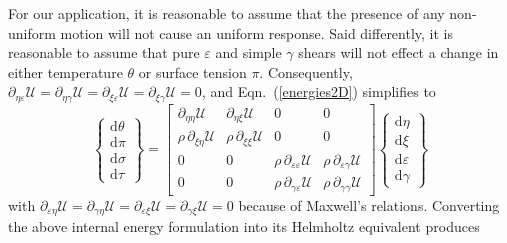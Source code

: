 For our application, it is reasonable to assume that the presence of any non-uniform motion will not cause an uniform response.  Said differently, it is reasonable to assume that pure $\varepsilon$ and simple $\gamma$ shears will not effect a change in either temperature $\theta$ or surface tension $\pi$.  Consequently, $\partial_{\eta\varepsilon} \mathcal{U} = \partial_{\eta\gamma} \mathcal{U} = \partial_{\xi\varepsilon} \mathcal{U} = \partial_{\xi\gamma} \mathcal{U} = 0$, and Eqn.~(\ref{energies2D}) simplifies to
\begin{displaymath}
\left\{ \begin{matrix}
\mathrm{d} \theta \\ \mathrm{d} \pi \\
\mathrm{d} \sigma \\ \mathrm{d} \tau
\end{matrix} \right\} = \begin{bmatrix}
\partial_{\eta\eta} \mathcal{U} & 
\partial_{\eta\xi} \mathcal{U} & 
0 & 0 \\ 
\rho \, \partial_{\xi\eta} \mathcal{U} & 
\rho \, \partial_{\xi\xi} \mathcal{U} & 
0 & 0 \\
0 & 0 & 
\rho \, \partial_{\varepsilon\varepsilon} \mathcal{U} & 
\rho \, \partial_{\varepsilon\gamma} \mathcal{U} \\
0 & 0 & 
\rho \, \partial_{\gamma\varepsilon} \mathcal{U} & 
\rho \, \partial_{\gamma\gamma} \mathcal{U} 
\end{bmatrix} 
\left\{ \begin{matrix}
\mathrm{d}\eta \\ \mathrm{d} \xi \\
\mathrm{d} \varepsilon \\ \mathrm{d} \gamma
\end{matrix} \right\} 
\end{displaymath}
with $\partial_{\varepsilon\eta} \mathcal{U} = \partial_{\gamma\eta} \mathcal{U} = \partial_{\varepsilon\xi} \mathcal{U} = \partial_{\gamma\xi} \mathcal{U} = 0$
because of Maxwell's relations.  Converting the above internal energy formulation into its Helmholtz equivalent produces
